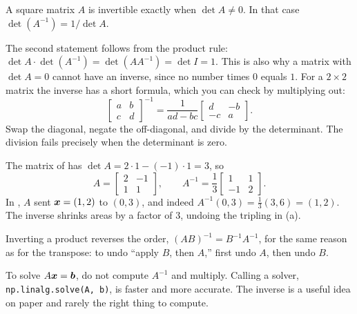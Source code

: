 \begin{proposition}[Invertibility]
  \label{prop:ch03-invertible}
  A square matrix $A$ is invertible exactly when $\det A \ne 0$. In that
  case $\det(A^{-1}) = 1 / \det A$.
\end{proposition}

The second statement follows from the product rule:
$\det A \cdot \det(A^{-1}) = \det(AA^{-1}) = \det I = 1$. This is also
why a matrix with $\det A = 0$ cannot have an inverse, since no number
times $0$ equals $1$. For a $2 \times 2$ matrix the inverse has a short
formula, which you can check by multiplying out:
\begin{equation}
  \begin{bmatrix} a & b \\ c & d \end{bmatrix}^{-1}
  = \frac{1}{ad - bc}
    \begin{bmatrix} d & -b \\ -c & a \end{bmatrix}.
  \label{eq:ch03-inverse-2x2}
\end{equation}
Swap the diagonal, negate the off-diagonal, and divide by the
determinant. The division fails precisely when the determinant is zero.

\begin{example}
  \label{ex:ch03-inverse}
  The matrix of  has $\det A = 2 \cdot 1 - (-1)
  \cdot 1 = 3$, so
  \[
    A = \begin{bmatrix} 2 & -1 \\ 1 & 1 \end{bmatrix}, \qquad
    A^{-1} = \frac{1}{3} \begin{bmatrix} 1 & 1 \\ -1 & 2 \end{bmatrix}.
  \]
  In , $A$ sent $\bm{x} = (1, 2)$ to $(0, 3)$, and
  indeed $A^{-1}(0, 3) = \tfrac{1}{3}(3, 6) = (1, 2)$. The inverse shrinks
  areas by a factor of $3$, undoing the tripling in
  (a).
\end{example}

Inverting a product reverses the order, $(AB)^{-1} = B^{-1} A^{-1}$, for
the same reason as for the transpose: to undo ``apply $B$, then $A$,''
first undo $A$, then undo $B$.

\begin{tip}
  To solve $A\bm{x} = \bm{b}$, do not compute $A^{-1}$ and multiply.
  Calling a solver, \texttt{np.linalg.solve(A, b)}, is faster and more
  accurate. The inverse is a useful idea on paper and rarely the right
  thing to compute.
\end{tip}

